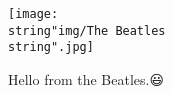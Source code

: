 \begin{figure}[!hb]
		\centering
		\texttt{[image: \\string"img/The 
		Beatles\\string".jpg]}
		\caption*{Hello from the Beatles.😃}
		\label{fig:the-beatles}
\end{figure}